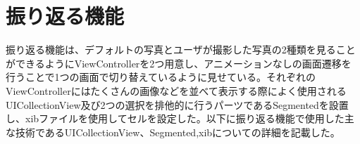 \section{振り返る機能}
振り返る機能は、デフォルトの写真とユーザが撮影した写真の2種類を見ることができるようにViewControllerを2つ用意し、アニメーションなしの画面遷移を行うことで1つの画面で切り替えているように見せている。それぞれのViewControllerにはたくさんの画像などを並べて表示する際によく使用されるUICollectionView及び2つの選択を排他的に行うパーツであるSegmentedを設置し、xibファイルを使用してセルを設定した。以下に振り返る機能で使用した主な技術であるUICollectionView、Segmented,xibについての詳細を記載した。

